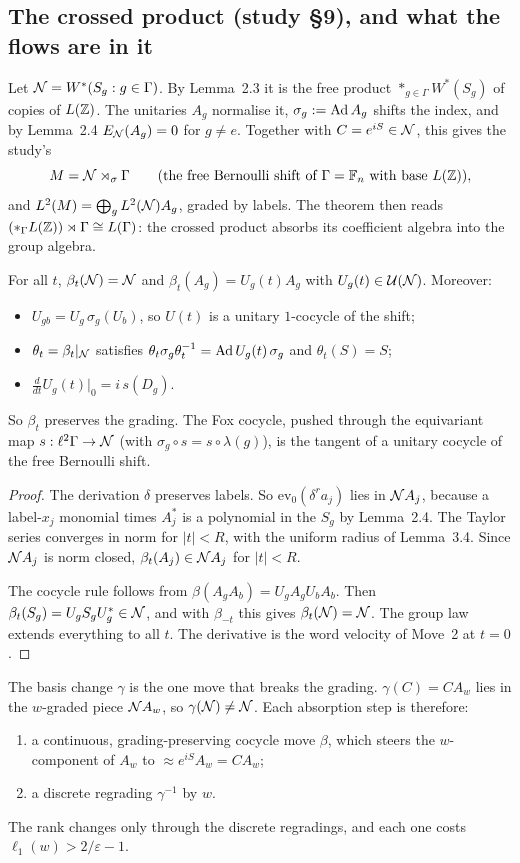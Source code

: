 \subsection{The crossed product (study \S9), and what the flows are in it}
Let $\mathcal N=W^*(S_g:g\in\Gamma)$. By Lemma~2.3 it is the free product $*_{g\in\Gamma}W^*(S_g)$ of copies of $L(\mathbb Z)$. The unitaries $A_g$ normalise it,
$\sigma_g:=\operatorname{Ad} A_g$ shifts the index, and by Lemma~2.4 $E_\mathcal N(A_g)=0$ for $g\ne e$. Together with $C=e^{iS}\in\mathcal N$, this gives the study's
\[
M=\mathcal N\rtimes_\sigma\Gamma\qquad\text{(the free Bernoulli shift of $\Gamma=\mathbb F_n$ with base $L(\mathbb Z)$)},
\]
and $L^2(M)=\bigoplus_g L^2(\mathcal N)A_g$, graded by labels. The theorem then reads $(*_\Gamma L(\mathbb Z))\rtimes\Gamma\cong L(\Gamma)$: the crossed product absorbs its
coefficient algebra into the group algebra.
\begin{proposition}
For all $t$, $\beta_t(\mathcal N)=\mathcal N$ and $\beta_t(A_g)=U_g(t)A_g$ with $U_g(t)\in\mathcal U(\mathcal N)$. Moreover:
\begin{itemize}[leftmargin=*]
\item $U_{gb}=U_g\,\sigma_g(U_b)$, so $U(t)$ is a unitary $1$-cocycle of the shift;
\item $\theta_t=\beta_t|_\mathcal N$ satisfies $\theta_t\sigma_g\theta_t^{-1}=\operatorname{Ad} U_g(t)\,\sigma_g$ and $\theta_t(S)=S$;
\item $\frac d{dt}U_g(t)|_{0}=i\,s(D_g)$.
\end{itemize}
So $\beta_t$ preserves the grading. The Fox cocycle, pushed through the equivariant map $s:\ell^2\Gamma\to\mathcal N$ (with $\sigma_g\circ s=s\circ\lambda(g)$), is the tangent of a
unitary cocycle of the free Bernoulli shift.
\end{proposition}
\begin{proof}
The derivation $\delta$ preserves labels. So $\mathrm{ev}_0(\delta^ra_j)$ lies in $\mathcal N A_j$, because a label-$x_j$ monomial times $A_j^*$ is a polynomial in the $S_g$ by
Lemma~2.4. The Taylor series converges in norm for $|t|<R$, with the uniform radius of Lemma~3.4. Since $\mathcal N A_j$ is norm closed,
$\beta_t(A_j)\in\mathcal N A_j$ for $|t|<R$.

The cocycle rule follows from $\beta(A_gA_b)=U_gA_gU_bA_b$. Then $\beta_t(S_g)=U_gS_gU_g^*\in\mathcal N$, and with $\beta_{-t}$ this gives $\beta_t(\mathcal N)=\mathcal N$. The group law
extends everything to all $t$. The derivative is the word velocity of Move~2 at $t=0$.
\end{proof}
The basis change $\gamma$ is the one move that breaks the grading. $\gamma(C)=CA_w$ lies in the $w$-graded piece $\mathcal N A_w$, so $\gamma(\mathcal N)\ne\mathcal N$. Each absorption
step is therefore:
\begin{enumerate}[leftmargin=*]
\item a continuous, grading-preserving cocycle move $\beta$, which steers the $w$-component of $A_w$ to $\approx e^{iS}A_w=CA_w$;
\item a discrete regrading $\gamma^{-1}$ by $w$.
\end{enumerate}
The rank changes only through the discrete regradings, and each one costs $\ell_1(w)>2/\varepsilon-1$.


